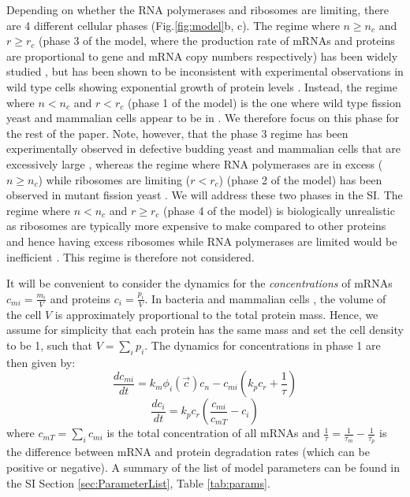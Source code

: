 \documentclass[10pt]{article}
\begin{document}
Depending on whether the RNA polymerases and ribosomes are limiting, there are 4 different cellular phases (Fig.\ref{fig:model}b, c). The regime where $n \geq n_c$ and $r \geq r_c$ (phase 3 of the model, where the production rate of mRNAs and proteins are proportional to gene and mRNA copy numbers respectively) has been widely studied \cite{paulsson2005models, shahrezaei2008analytical, thattai2001intrinsic}, but has been shown to be inconsistent with experimental observations in wild type cells showing exponential growth of protein levels \cite{zhurinsky2010coordinated, schmidt1995cell}. Instead, the regime where $n<n_c$ and $r<r_c$ (phase 1 of the model) is the one where wild type fission yeast \cite{zhurinsky2010coordinated} and mammalian cells appear to be in \cite{schmidt1995cell}. We therefore focus on this phase for the rest of the paper. Note, however, that the phase 3 regime has been experimentally observed in defective budding yeast and mammalian cells that are excessively large \cite{neurohr2019excessive}, whereas the regime where RNA polymerases are in excess ($n \geq n_c$) while ribosomes are limiting ($r<r_c$) (phase 2 of the model) has been observed in mutant fission yeast \cite{zhurinsky2010coordinated}. We will address these two phases in the SI. The regime where $n<n_c$ and $r \geq r_c$ (phase 4 of the model) is biologically unrealistic as ribosomes are typically more expensive to make compared to other proteins and hence having excess ribosomes while RNA polymerases are limited would be inefficient \cite{reuveni2017ribosomes, scott2010interdependence}. This regime is therefore not considered.
 
It will be convenient to consider the dynamics for the \textit{concentrations} of mRNAs $c_{mi} = \frac{m_i}{V}$ and proteins $c_i = \frac{p_i}{V}$. In bacteria \cite{kubitschek1984independence, basan2015inflating} and mammalian cells \cite{crissman1973rapid}, the volume of the cell $V$ is approximately proportional to the total protein mass. Hence, we assume for simplicity that each protein has the same mass and set the cell density to be 1, such that $V = \sum_i p_i$. The dynamics for concentrations in phase 1 are then given by:
\begin{equation}
    \frac{dc_{mi}}{dt} = 
    k_m \phi_i(\vec{c}) c_n - c_{mi} \left(k_p c_r + \frac{1}{\tau}\right) 
    \label{eqn:dcmdt}
\end{equation}
\begin{equation}
    \frac{dc_i}{dt} = k_p c_r \left( \frac{c_{mi}}{c_{mT}} - c_i \right) 
    \label{eqn:dcpdt}
\end{equation}
where $c_{mT} = \sum_i c_{mi}$ is the total concentration of all mRNAs and $\frac{1}{\tau} = \frac{1}{\tau_m} - \frac{1}{\tau_p}$ is the difference between mRNA and protein degradation rates (which can be positive or negative). A summary of the list of model parameters can be found in the SI Section \ref{sec:ParameterList}, Table \ref{tab:params}. 
\end{document}
